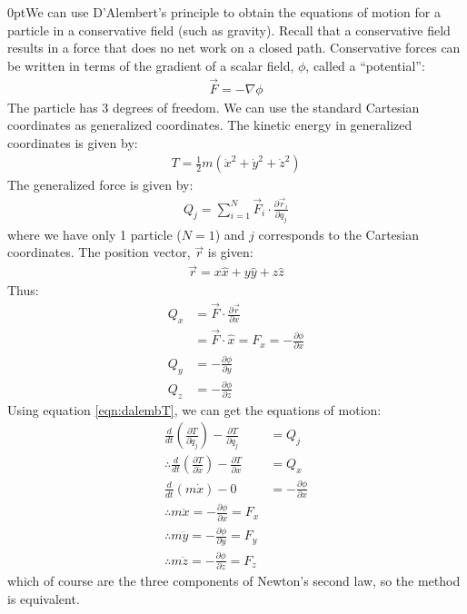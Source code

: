 \begin{example}{0pt}{We can use D'Alembert's principle to obtain the equations of motion for a particle in a conservative field (such as gravity).}{}
Recall that a conservative field results in a force that does no net work on a closed path. Conservative forces can be written in terms of the gradient of a scalar field, $\phi$, called a ``potential'':
\begin{align*}
\vec{F}=-\nabla\phi
\end{align*}
The particle has 3 degrees of freedom. We can use the standard Cartesian coordinates as generalized coordinates. The kinetic energy in generalized coordinates is given by:
\begin{align*}
T=\frac{1}{2}m(\dot{x}^2+\dot{y}^2+\dot{z}^2)
\end{align*}
The generalized force is given by:
\begin{align*}
Q_j=\sum_{i=1}^N\vec{F}_i\cdot\frac{\partial\vec{r}_i}{\partial q_j}\nonumber
\end{align*}
where we have only 1 particle ($N=1$) and $j$ corresponds to the Cartesian coordinates. The position vector, $\vec{r}$ is given:
\begin{align*}
\vec{r}=x\hat{x}+y\hat{y}+z\hat{z}
\end{align*}
Thus:
\begin{align*}
Q_x&=\vec{F}\cdot\frac{\partial\vec{r}}{\partial x}\nonumber\\
&=\vec{F}\cdot\hat{x}=F_x=-\frac{\partial \phi}{\partial x}\nonumber\\
Q_y&=-\frac{\partial \phi}{\partial y}\nonumber\\
Q_z&=-\frac{\partial \phi}{\partial z}\nonumber
\end{align*}
Using equation \ref{eqn:dalembT}, we can get the equations of motion:
\begin{align*}
\frac{d}{dt}\left(\frac{\partial T}{\partial \dot{q}_j} \right) - \frac{\partial T}{\partial q_j}&=Q_j\nonumber\\
\therefore \frac{d}{dt}\left(\frac{\partial T}{\partial \dot{x}} \right) - \frac{\partial T}{\partial x}&=Q_x\nonumber\\
\frac{d}{dt}\left(m\dot{x} \right) - 0&=-\frac{\partial \phi}{\partial x}\nonumber\\
\therefore m\ddot{x}=-\frac{\partial \phi}{\partial x}=F_x\nonumber\\
\therefore m\ddot{y}=-\frac{\partial \phi}{\partial y}=F_y\nonumber\\
\therefore m\ddot{z}=-\frac{\partial \phi}{\partial z}=F_z\nonumber
\end{align*}
which of course are the three components of Newton's second law, so the method is equivalent.


\end{example}
